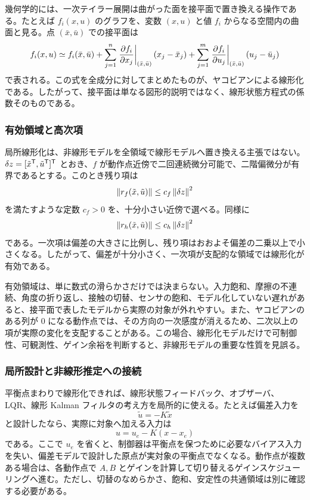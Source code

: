 幾何学的には、一次テイラー展開は曲がった面を接平面で置き換える操作である。たとえば $f_i(x,u)$ のグラフを、変数 $(x,u)$ と値 $f_i$ からなる空間内の曲面と見る。点 $(\bar{x},\bar{u})$ での接平面は
\begin{equation}
  f_i(x,u)\simeq
  f_i(\bar{x},\bar{u})
  +\sum_{j=1}^{n}
    \left.\frac{\partial f_i}{\partial x_j}\right|_{(\bar{x},\bar{u})}(x_j-\bar{x}_j)
  +\sum_{j=1}^{m}
    \left.\frac{\partial f_i}{\partial u_j}\right|_{(\bar{x},\bar{u})}(u_j-\bar{u}_j)
\end{equation}
で表される。この式を全成分に対してまとめたものが、ヤコビアンによる線形化である。したがって、接平面は単なる図形的説明ではなく、線形状態方程式の係数そのものである。

\subsubsection{有効領域と高次項}

局所線形化は、非線形モデルを全領域で線形モデルへ置き換える主張ではない。$\delta z=[\tilde{x}^{\mathsf{T}},\tilde{u}^{\mathsf{T}}]^{\mathsf{T}}$ とおき、$f$ が動作点近傍で二回連続微分可能で、二階偏微分が有界であるとする。このとき残り項は
\begin{equation}
  \left\|r_f(\tilde{x},\tilde{u})\right\|
  \le c_f\left\|\delta z\right\|^2
\end{equation}
を満たすような定数 $c_f>0$ を、十分小さい近傍で選べる。同様に
\begin{equation}
  \left\|r_h(\tilde{x},\tilde{u})\right\|
  \le c_h\left\|\delta z\right\|^2
\end{equation}
である。一次項は偏差の大きさに比例し、残り項はおおよそ偏差の二乗以上で小さくなる。したがって、偏差が十分小さく、一次項が支配的な領域では線形化が有効である。

有効領域は、単に数式の滑らかさだけでは決まらない。入力飽和、摩擦の不連続、角度の折り返し、接触の切替、センサの飽和、モデル化していない遅れがあると、接平面で表したモデルから実際の対象が外れやすい。また、ヤコビアンのある列が 0 になる動作点では、その方向の一次感度が消えるため、二次以上の項が実際の変化を支配することがある。この場合、線形化モデルだけで可制御性、可観測性、ゲイン余裕を判断すると、非線形モデルの重要な性質を見誤る。

\subsubsection{局所設計と非線形推定への接続}

平衡点まわりで線形化できれば、線形状態フィードバック、オブザーバ、LQR、線形 Kalman フィルタの考え方を局所的に使える。たとえば偏差入力を
\begin{equation}
  \tilde{u}=-K\tilde{x}
\end{equation}
と設計したなら、実際に対象へ加える入力は
\begin{equation}
  u=u_e-K(x-x_e)
\end{equation}
である。ここで $u_e$ を省くと、制御器は平衡点を保つために必要なバイアス入力を失い、偏差モデルで設計した原点が実対象の平衡点でなくなる。動作点が複数ある場合は、各動作点で $A,B$ とゲインを計算して切り替えるゲインスケジューリングへ進む。ただし、切替のなめらかさ、飽和、安定性の共通領域は別に確認する必要がある。

